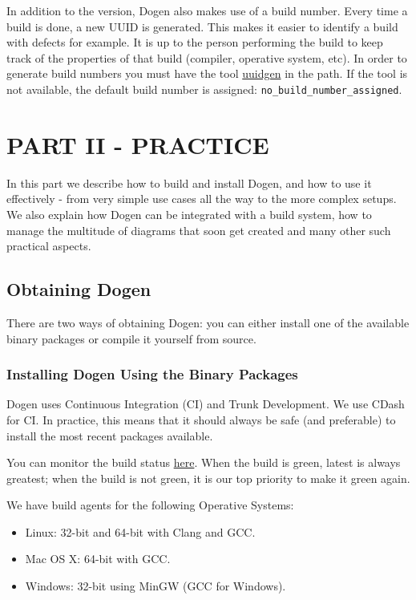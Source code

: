 \documentclass[11pt]{article}
\begin{document}
In addition to the version, Dogen also makes use of a build
number. Every time a build is done, a new UUID is generated. This
makes it easier to identify a build with defects for example. It is up
to the person performing the build to keep track of the properties of
that build (compiler, operative system, etc). In order to generate
build numbers you must have the tool \href{http://www.linuxcommand.org/man_pages/uuidgen1.html}{uuidgen} in the path. If the tool
is not available, the default build number is assigned:
\texttt{no\_build\_number\_assigned}.

\section{PART II - PRACTICE}
\label{sec-3}

In this part we describe how to build and install Dogen, and how to
use it effectively - from very simple use cases all the way to the
more complex setups. We also explain how Dogen can be integrated with
a build system, how to manage the multitude of diagrams that soon get
created and many other such practical aspects.

\subsection{Obtaining Dogen}
\label{sec-3-1}

There are two ways of obtaining Dogen: you can either install one of
the available binary packages or compile it yourself from source.

\subsubsection{Installing Dogen Using the Binary Packages}
\label{sec-3-1-1}

Dogen uses Continuous Integration (CI) and Trunk Development. We use
CDash for CI. In practice, this means that it should always be safe
(and preferable) to install the most recent packages available.

You can monitor the build status \href{http://my.cdash.org/index.php?project\%3DDogen}{here}. When the build is green, latest
is always greatest; when the build is not green, it is our top
priority to make it green again.

We have build agents for the following Operative Systems:

\begin{itemize}
\item Linux: 32-bit and 64-bit with Clang and GCC.
\item Mac OS X: 64-bit with GCC.
\item Windows: 32-bit using MinGW (GCC for Windows).
\end{itemize}
\end{document}
